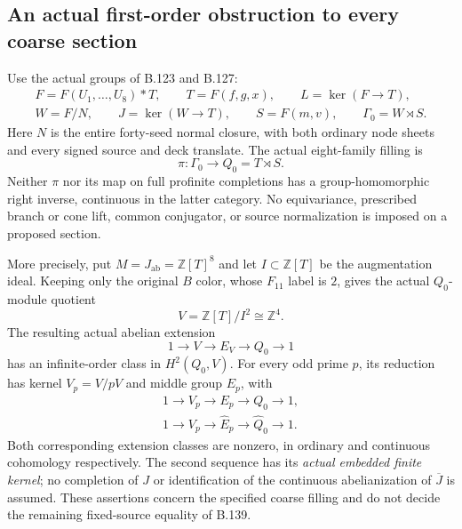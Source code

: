 \subsection*{An actual first-order obstruction to every coarse section}

\label{stmt:B142}
Use the actual groups of B.123 and B.127:
\[
 \begin{gathered}
 F=F(U_1,\ldots,U_8)*T,\qquad T=F(f,g,x),\qquad L=\ker(F\to T),\\
 W=F/N,\qquad J=\ker(W\to T),\qquad
 S=F(m,v),\qquad \Gamma_0=W\rtimes S.
 \end{gathered}
\]
Here $N$ is the entire forty-seed normal closure, with both ordinary
node sheets and every signed source and deck translate. The actual
eight-family filling is
\begin{equation}\label{eq:B142-coarse-map}
 \pi:\Gamma_0\longrightarrow Q_0=T\rtimes S.
\end{equation}
Neither $\pi$ nor its map on full profinite completions has a
group-homomorphic right inverse, continuous in the latter category.
No equivariance, prescribed branch or cone lift, common conjugator,
or source normalization is imposed on a proposed section.

More precisely, put $M=J_{\mathrm{ab}}=\mathbb Z[T]^8$ and let
$I\subset\mathbb Z[T]$ be the augmentation ideal. Keeping only the
original $B$ color, whose $F_{11}$ label is $2$, gives the actual
$Q_0$-module quotient
\[
 V=\mathbb Z[T]/I^2\cong\mathbb Z^4.
\]
The resulting actual abelian extension
\begin{equation}\label{eq:B142-integral-extension}
 1\longrightarrow V\longrightarrow E_V
   \longrightarrow Q_0\longrightarrow1
\end{equation}
has an infinite-order class in $H^2(Q_0,V)$. For every odd prime $p$,
its reduction has kernel $V_p=V/pV$ and middle group $E_p$, with
\begin{equation}\label{eq:B142-finite-extensions}
 \begin{gathered}
 1\longrightarrow V_p\longrightarrow E_p
   \longrightarrow Q_0\longrightarrow1,\\
 1\longrightarrow V_p\longrightarrow\widehat E_p
   \longrightarrow\widehat Q_0\longrightarrow1.
 \end{gathered}
\end{equation}
Both corresponding extension classes are nonzero, in ordinary and
continuous cohomology respectively. The second sequence has its
\emph{actual embedded finite kernel}; no completion of $J$ or
identification of the continuous abelianization of $\overline J$
is assumed. These assertions concern the specified coarse filling
and do not decide the remaining fixed-source equality of B.139.

